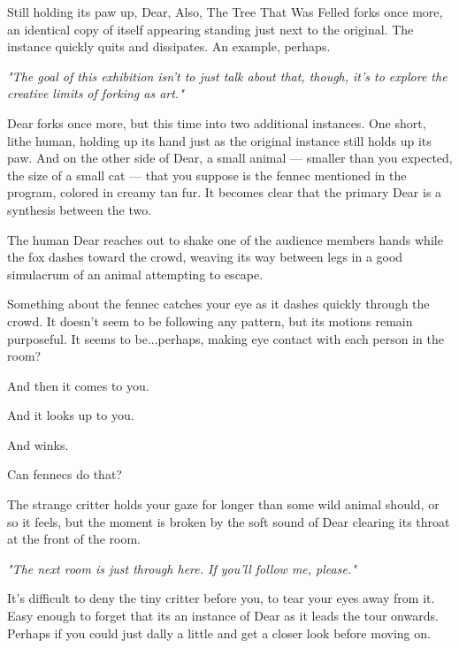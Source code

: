 Still holding its paw up, Dear, Also, The Tree That Was Felled forks once more, an identical copy of itself appearing standing just next to the original. The instance quickly quits and dissipates. An example, perhaps.

\emph{"The goal of this exhibition isn't to just talk about that, though, it's to explore the creative limits of forking as art."}

Dear forks once more, but this time into two additional instances. One short, lithe human, holding up its hand just as the original instance still holds up its paw. And on the other side of Dear, a small animal --- smaller than you expected, the size of a small cat --- that you suppose is the fennec mentioned in the program, colored in creamy tan fur. It becomes clear that the primary Dear is a synthesis between the two.

The human Dear reaches out to shake one of the audience members hands while the fox dashes toward the crowd, weaving its way between legs in a good simulacrum of an animal attempting to escape.

\newpage

\null
\vfill

Something about the fennec catches your eye as it dashes quickly through the crowd. It doesn't seem to be following any pattern, but its motions remain purposeful. It seems to be...perhaps, making eye contact with each person in the room?

\vfill

\newpage

\null
\vfill

And then it comes to you.

\vfill

\newpage

\null
\vfill

And it looks up to you.

\vfill

\newpage

And winks.

Can fennecs do that?

The strange critter holds your gaze for longer than some wild animal should, or so it feels, but the moment is broken by the soft sound of Dear clearing its throat at the front of the room.

\emph{"The next room is just through here. If you'll follow me\textsuperscript{\pageref{follow-dear}}, please."}

It's difficult to deny the tiny critter before you, to tear your eyes away from it. Easy enough to forget that its an instance of Dear as it leads the tour onwards. Perhaps if you could just dally a little and get a closer look\textsuperscript{\pageref{follow-fennec}} before moving on.

